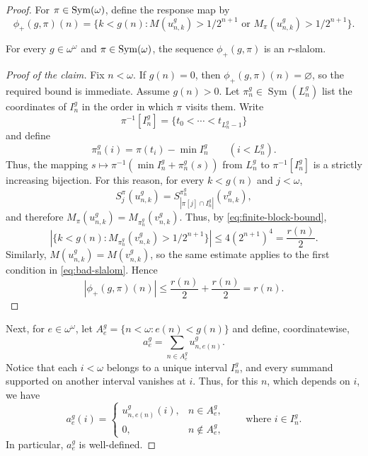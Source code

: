 \begin{proof}
For $\pi\in\operatorname{Sym}(\omega)$, define the response map by
\begin{equation}\label{eq:bad-slalom}
 \phi_+(g,\pi)(n)=
 \{k<g(n):M(u_{n,k}^g)>1/2^{n+1}
                  \text{ or }M_\pi(u_{n,k}^g)>1/2^{n+1}\}.
\end{equation}

\begin{claim}
For every $g\in\omega^\omega$ and $\pi\in\operatorname{Sym}(\omega)$, the sequence
$\phi_+(g,\pi)$ is an $r$-slalom.
\end{claim}

\begin{proof}[Proof of the claim]
Fix $n<\omega$. If $g(n)=0$, then $\phi_+(g,\pi)(n)=\varnothing$,
so the required bound is immediate. Assume $g(n)>0$.
Let $\pi_n^{g}\in\operatorname{Sym}(L_n^g)$ list the coordinates of
$I_n^g$ in the order in which $\pi$ visits them. Write
\[
    \pi^{-1}[I_n^g]=\{t_0<\cdots<t_{L_n^g-1}\}
\]
and define
\[
    \pi_n^g(i)=\pi(t_i)-\min I_n^g\qquad(i<L_n^g).
\]
Thus, the mapping
$s\mapsto\pi^{-1}(\min I_n^g+\pi_n^{g}(s))$ from $L_{n}^g$ to $\pi^{-1}[I_n^g]$ is a strictly increasing bijection.
For this reason, for every $k<g(n)$ and $j<\omega$,
\[
 S_j^\pi(u_{n,k}^g)=S_{|\pi[j]\cap I_n^g|}^{\pi_n^{g}}(v_{n,k}^g),
\]
and therefore $M_\pi(u_{n,k}^g)=M_{\pi_n^{g}}(v_{n,k}^g)$.
Thus, by \eqref{eq:finite-block-bound},
\[
    |\{k<g(n):M_{\pi_n^{g}}(v_{n,k}^g)>1/2^{n+1}\}|
    \leq 4(2^{n+1})^4=\frac{r(n)}2.
\]
Similarly, $M(u_{n,k}^g)=M(v_{n,k}^g)$, so the same
estimate applies to the first condition in \eqref{eq:bad-slalom}. Hence
\begin{equation*}
 |\phi_+(g,\pi)(n)|\leq\frac{r(n)}2+\frac{r(n)}2=r(n).
\end{equation*}
\end{proof}

Next, for $e\in\omega^\omega$, let $A_e^g=\{n<\omega:e(n)<g(n)\}$ and define, coordinatewise,
\begin{equation*}
 a_e^g=\sum_{n\in A_e^g}u_{n,e(n)}^g.
\end{equation*}
Notice that each $i<\omega$ belongs to
a unique interval $I_n^g$, and every summand supported on another
interval vanishes at $i$. Thus, for this $n$, which depends on $i$, we have
\[
 a_e^g(i)=
 \begin{cases}
  u_{n,e(n)}^g(i),&n\in A_e^g,\\
  0,&n\notin A_e^g,
 \end{cases}
 \qquad\text{where }i\in I_n^g.
\]
In particular, $a_e^g$ is well-defined.


\end{proof}
